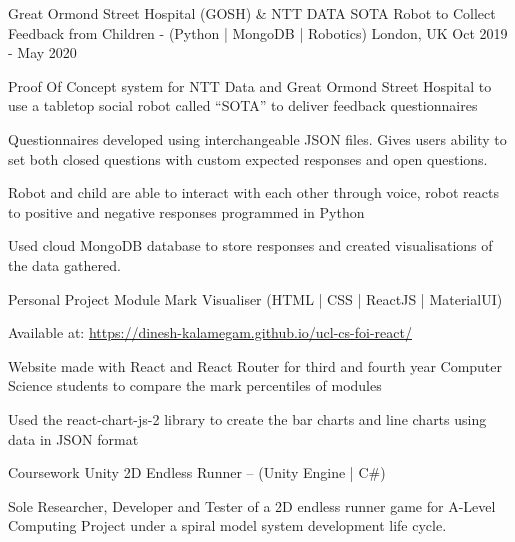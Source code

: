 
\begin{cventries}
  \cventry
    {Great Ormond Street Hospital (GOSH) \& NTT DATA} %
    {SOTA Robot to Collect Feedback from Children - (Python | MongoDB | Robotics)} %
    {London, UK} %
    {Oct 2019 - May 2020} %
    {
      \begin{cvitems} %
        \item {Proof Of Concept system for NTT Data and Great Ormond Street Hospital to use a tabletop social robot called ``SOTA'' to deliver feedback questionnaires}
        \item Questionnaires developed using interchangeable JSON files. Gives users ability to set both closed questions with custom expected responses and open questions. 
        \item{Robot and child are able to interact with each other through voice, robot reacts to positive and negative responses programmed in Python}
        \item{Used cloud MongoDB database to store responses and created visualisations of the data gathered.}
      \end{cvitems}
    }

  \cventry
    {Personal Project}
    {Module Mark Visualiser (HTML | CSS | ReactJS | MaterialUI)}
    {}
    {}
    {
      \begin{cvitems}
        \item Available at: \href{https://dinesh-kalamegam.github.io/ucl-cs-foi-react/}{https://dinesh-kalamegam.github.io/ucl-cs-foi-react/}
        \item Website made with React and React Router for third and fourth year Computer Science students to compare the mark percentiles of modules
        \item Used the react-chart-js-2 library to create the bar charts and line charts using data in JSON format
      \end{cvitems}
    }

  \cventry
    {Coursework}
    {Unity 2D Endless Runner – (Unity Engine | C\#)}
    {}
    {}
    {
      \begin{cvitems}
        \item Sole Researcher, Developer and Tester of a 2D endless runner game for A-Level Computing Project under a spiral model system development life cycle.
      \end{cvitems}
    }

\end{cventries}
